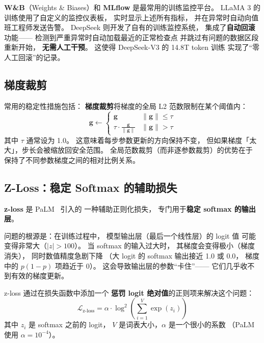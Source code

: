 \textbf{W\&B}（Weights \& Biases）和 \textbf{MLflow}
是最常用的训练监控平台。
LLaMA 3 的训练使用了自定义的监控仪表板，
实时显示上述所有指标，
并在异常时自动向值班工程师发送告警。
DeepSeek 则开发了自有的训练监控系统，
集成了\textbf{自动回滚}功能——
检测到严重异常时自动加载最近的正常检查点
并跳过有问题的数据区段重新开始，
\textbf{无需人工干预}。
这使得 DeepSeek-V3 的 14.8T token 训练
实现了``零人工回滚''的记录。

\subsection{梯度裁剪}

常用的稳定性措施包括：
\textbf{梯度裁剪}将梯度的全局 L2 范数限制在某个阈值内：
\begin{equation}
  \mathbf{g} \leftarrow \begin{cases}
    \mathbf{g} & \|\mathbf{g}\| \leq \tau \\
    \tau \cdot \frac{\mathbf{g}}{\|\mathbf{g}\|} & \|\mathbf{g}\| > \tau
  \end{cases}
  \label{eq:grad-clip}
\end{equation}
其中 $\tau$ 通常设为 1.0。
这意味着每步参数更新的方向保持不变，
但如果梯度「太大」，步长会被缩放回安全范围。
全局范数裁剪（而非逐参数裁剪）的优势在于
保持了不同参数梯度之间的相对比例关系。

\subsection{Z-Loss：稳定 Softmax 的辅助损失}

\textbf{z-loss} 是 PaLM~\cite{chowdhery2022palm} 引入的
一种辅助正则化损失，
专门用于\textbf{稳定 softmax 的输出层}。

问题的根源是：在训练过程中，
模型输出层（最后一个线性层）的 logit 值
可能变得非常大（$|z| > 100$）。
当 softmax 的输入过大时，
其梯度会变得极小（梯度消失），
同时数值精度急剧下降
（大 logit 的 softmax 输出接近 1.0 或 0.0，
梯度中的 $p(1-p)$ 项趋近于 0）。
这会导致输出层的参数``卡住''——
它们几乎收不到有效的梯度更新。

z-loss 通过在损失函数中添加一个
\textbf{惩罚 logit 绝对值}的正则项来解决这个问题：
\begin{equation}
  \mathcal{L}_{\text{z-loss}} = \alpha \cdot \log^2\!\left(
    \sum_{i=1}^{V} \exp(z_i)
  \right)
  \label{eq:z-loss}
\end{equation}
其中 $z_i$ 是 softmax 之前的 logit，
$V$ 是词表大小，$\alpha$ 是一个很小的系数
（PaLM 使用 $\alpha = 10^{-4}$）。

